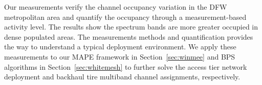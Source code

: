 Our measurements verify the channel occupancy variation in the DFW metropolitan area and quantify the occupancy
through a measurement-based activity level. The results show the spectrum bands are more greater occupied in
dense populated areas. The measurements 
methods and quantification provides the way to 
understand a typical deployment environment. We apply these 
measurements to our MAPE framework in Section~\ref{sec:winmee} and BPS algorithms in Section~\ref{sec:whitemesh} to further solve the 
access tier network deployment and backhaul tire multiband channel assignments, respectively.
